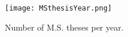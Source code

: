 \documentclass{article}
\begin{document}

\begin{figure}[t]
\texttt{[image: MSthesisYear.png]}
\caption{Number of M.S. theses per year.}
\end{figure}


\medskip
\nocite{*}



\end{document}
